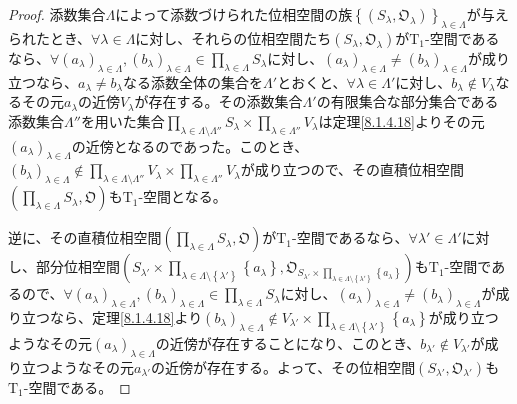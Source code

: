 \documentclass[dvipdfmx]{jsarticle}
\begin{document}
\begin{proof}
添数集合$\varLambda$によって添数づけられた位相空間の族$\left\{ \left( S_{\lambda},\mathfrak{O}_{\lambda} \right) \right\}_{\lambda \in \varLambda}$が与えられたとき、$\forall\lambda \in \varLambda$に対し、それらの位相空間たち$\left( S_{\lambda},\mathfrak{O}_{\lambda} \right)$が$\mathrm{T}_{1}$-空間であるなら、$\forall\left( a_{\lambda} \right)_{\lambda \in \varLambda},\left( b_{\lambda} \right)_{\lambda \in \varLambda} \in \prod_{\lambda \in \varLambda} S_{\lambda}$に対し、$\left( a_{\lambda} \right)_{\lambda \in \varLambda} \neq \left( b_{\lambda} \right)_{\lambda \in \varLambda}$が成り立つなら、$a_{\lambda} \neq b_{\lambda}$なる添数全体の集合を$\varLambda'$とおくと、$\forall\lambda \in \varLambda'$に対し、$b_{\lambda} \notin V_{\lambda}$なるその元$a_{\lambda}$の近傍$V_{\lambda}$が存在する。その添数集合$\varLambda'$の有限集合な部分集合である添数集合$\varLambda''$を用いた集合$\prod_{\lambda \in \varLambda \setminus \varLambda''} S_{\lambda} \times \prod_{\lambda \in \varLambda''} V_{\lambda}$は定理\ref{8.1.4.18}よりその元$\left( a_{\lambda} \right)_{\lambda \in \varLambda}$の近傍となるのであった。このとき、$\left( b_{\lambda} \right)_{\lambda \in \varLambda} \notin \prod_{\lambda \in \varLambda \setminus \varLambda''} V_{\lambda} \times \prod_{\lambda \in \varLambda''} V_{\lambda}$が成り立つので、その直積位相空間$\left( \prod_{\lambda \in \varLambda} S_{\lambda},\mathfrak{O} \right)$も$\mathrm{T}_{1}$-空間となる。\par
逆に、その直積位相空間$\left( \prod_{\lambda \in \varLambda} S_{\lambda},\mathfrak{O} \right)$が$\mathrm{T}_{1}$-空間であるなら、$\forall\lambda' \in \varLambda'$に対し、部分位相空間$\left( S_{\lambda'} \times \prod_{\lambda \in \varLambda \setminus \left\{ \lambda' \right\}} \left\{ a_{\lambda} \right\},\mathfrak{O}_{S_{\lambda'} \times \prod_{\lambda \in \varLambda \setminus \left\{ \lambda' \right\}} \left\{ a_{\lambda} \right\}} \right)$も$\mathrm{T}_{1}$-空間であるので、$\forall\left( a_{\lambda} \right)_{\lambda \in \varLambda},\left( b_{\lambda} \right)_{\lambda \in \varLambda} \in \prod_{\lambda \in \varLambda} S_{\lambda}$に対し、$\left( a_{\lambda} \right)_{\lambda \in \varLambda} \neq \left( b_{\lambda} \right)_{\lambda \in \varLambda}$が成り立つなら、定理\ref{8.1.4.18}より$\left( b_{\lambda} \right)_{\lambda \in \varLambda} \notin V_{\lambda'} \times \prod_{\lambda \in \varLambda \setminus \left\{ \lambda' \right\}} \left\{ a_{\lambda} \right\}$が成り立つようなその元$\left( a_{\lambda} \right)_{\lambda \in \varLambda}$の近傍が存在することになり、このとき、$b_{\lambda'} \notin V_{\lambda'}$が成り立つようなその元$a_{\lambda'}$の近傍が存在する。よって、その位相空間$\left( S_{\lambda'},\mathfrak{O}_{\lambda'} \right)$も$\mathrm{T}_{1}$-空間である。
\end{proof}
\end{document}
